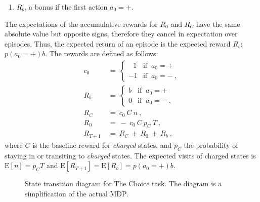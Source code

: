 \documentclass{article}
\newcommand\EXP{\mathbf{\mathrm{E}}}
\begin{document}
\begin{appendices}
\begin{enumerate}
     \item $R_b$, a bonus if the first action $a_0=+$.
 \end{enumerate}
The expectations of the accumulative rewards for $R_0$ and $R_C$ 
have the same absolute value but opposite signs, 
therefore they cancel in expectation over episodes.
Thus, the expected return of an episode is the expected reward $R_b$: $p(a_0=+) b$. 
The rewards are defined as follows:
\begin{align}
    c_0 \ &=  \ \begin{cases} 
     ~~~1 & \text{if }  \ a_0 = + \\
     -1 & \text{if }  \ a_0 = - \ ,
     \end{cases} \\
     R_b \ &=  \ \begin{cases} 
     b & \text{if }  \ a_0 = + \\
     0 & \text{if }  \ a_0 = - \ ,
     \end{cases} \\
    R_C \ &= \ c_0 \ C \ n \ ,  \\
    R_0 \ &= \ - \ c_0 \ C \ p_C  \ T \ , \\
    R_{T+1} \ &= \ R_C \ + \ R_0 \ + \ R_b \ ,
\end{align}
where $C$ is the baseline reward for {\em charged} states, 
and $p_C$ the probability of staying in or transiting to {\em charged} states.
The expected visits of charged states is $\EXP[n]= p_C  T$ and
$\EXP[R_{T+1}]= \EXP[R_b]=p(a_0=+) b$.

\begin{figure}
\centering
{}
\caption{State transition diagram for The Choice task. 
The diagram is a simplification of the actual MDP.}
\end{figure}



\end{appendices}
\end{document}
